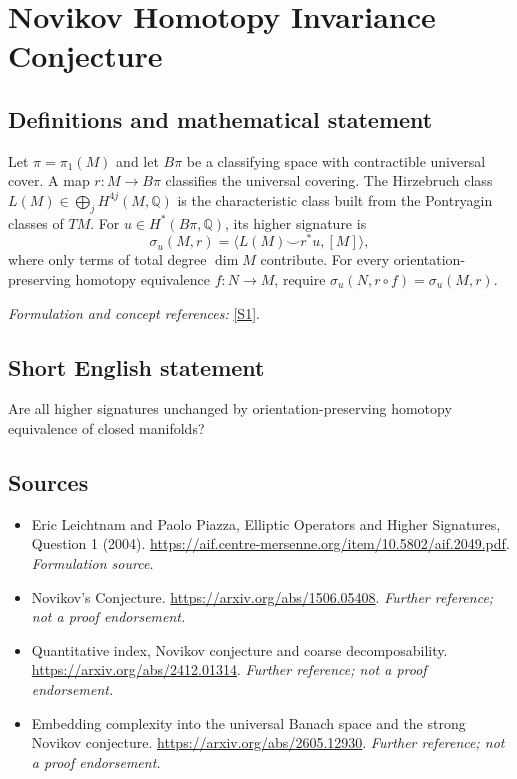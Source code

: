 \documentclass[11pt]{article}
\begin{document}
\section*{\texorpdfstring{Novikov Homotopy Invariance Conjecture}{Novikov Homotopy Invariance Conjecture}}\label{30001499}
\subsection{Definitions and mathematical statement}
Let $\pi=\pi_1(M)$ and let $B\pi$ be a classifying space with contractible universal cover. A map $r:M\to B\pi$ classifies the universal covering. The Hirzebruch class $L(M)\in\bigoplus_jH^{4j}(M,{\mathbb{Q}})$ is the characteristic class built from the Pontryagin classes of $TM$. For $u\in H^*(B\pi,{\mathbb{Q}})$, its higher signature is
\[
 \sigma_u(M,r)=\langle L(M)\smile r^*u,[M]\rangle,
\]
where only terms of total degree $\dim M$ contribute. For every orientation-preserving homotopy equivalence $f:N\to M$, require $\sigma_u(N,r\circ f)=\sigma_u(M,r)$.
\par\smallskip\textit{Formulation and concept references:} \href{https://aif.centre-mersenne.org/item/10.5802/aif.2049.pdf}{[S1]}.

\subsection{Short English statement}
Are all higher signatures unchanged by orientation-preserving homotopy equivalence of closed manifolds?
\subsection{Sources}
\begin{itemize}
\item[S1]Eric Leichtnam and Paolo Piazza, Elliptic Operators and Higher Signatures, Question 1 (2004).
\url{https://aif.centre-mersenne.org/item/10.5802/aif.2049.pdf}.
\textit{Formulation source.}
\item[S2]Novikov's Conjecture.
\url{https://arxiv.org/abs/1506.05408}.
\textit{Further reference; not a proof endorsement.}
\item[S3]Quantitative index, Novikov conjecture and coarse decomposability.
\url{https://arxiv.org/abs/2412.01314}.
\textit{Further reference; not a proof endorsement.}
\item[S4]Embedding complexity into the universal Banach space and the strong Novikov conjecture.
\url{https://arxiv.org/abs/2605.12930}.
\textit{Further reference; not a proof endorsement.}
\end{itemize}
\end{document}
